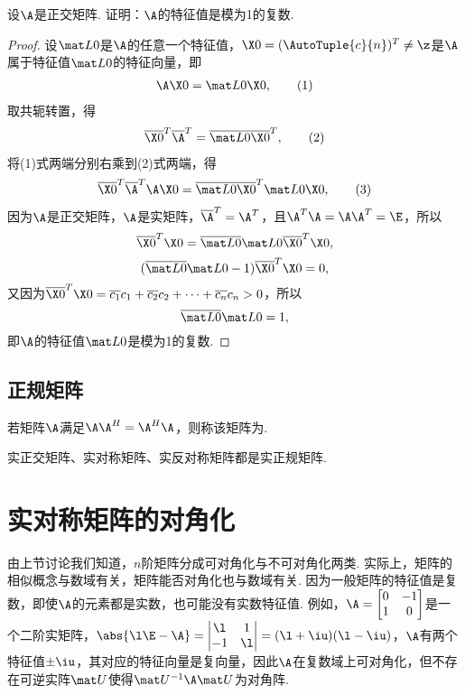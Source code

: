 \begin{example}
设\(\A\)是正交矩阵.
证明：\(\A\)的特征值是模为1的复数.
\begin{proof}
设\(\L0\)是\(\A\)的任意一个特征值，\(\X0=(\AutoTuple{c}{n})^T\neq\z\)是\(\A\)属于特征值\(\L0\)的特征向量，即\begin{gather}
\A\X0=\L0\X0, \tag1
\end{gather}
取共轭转置，得\begin{gather}
\overline{\X0}^T \overline{\A}^T = \overline{\L0} \overline{\X0}^T, \tag2
\end{gather}
将(1)式两端分别右乘到(2)式两端，得\begin{gather}
\overline{\X0}^T \overline{\A}^T \A\X0 = \overline{\L0} \overline{\X0}^T \L0\X0, \tag3
\end{gather}
因为\(\A\)是正交矩阵，\(\A\)是实矩阵，\(\overline{\A}^T = \A^T\)，且\(\A^T\A=\A\A^T=\E\)，所以\[
\overline{\X0}^T \X0 = \overline{\L0} \L0 \overline{\X0}^T \X0,
\]\[
(\overline{\L0} \L0 - 1) \overline{\X0}^T \X0 = 0,
\]又因为\(\overline{\X0}^T \X0 = \overline{c_1}c_1 + \overline{c_2}c_2 + \dotsb + \overline{c_n}{c_n} > 0\)，所以\[
\overline{\L0} \L0 = 1,
\]即\(\A\)的特征值\(\L0\)是模为1的复数.
\end{proof}
\end{example}

\subsection{正规矩阵}
\begin{definition}
若矩阵\(\A\)满足\(\A\A^H = \A^H\A\)，则称该矩阵为.
\end{definition}

\begin{property}
实正交矩阵、实对称矩阵、实反对称矩阵都是实正规矩阵.
\end{property}

\section{实对称矩阵的对角化}
由上节讨论我们知道，\(n\)阶矩阵分成可对角化与不可对角化两类.
实际上，矩阵的相似概念与数域有关，矩阵能否对角化也与数域有关.
因为一般矩阵的特征值是复数，即使\(\A\)的元素都是实数，也可能没有实数特征值.
例如，\(\A = \begin{bmatrix} 0 & -1 \\ 1 & 0 \end{bmatrix}\)是一个二阶实矩阵，\(\abs{\l\E-\A}=\begin{vmatrix} \l & 1 \\ -1 & \l \end{vmatrix} = (\l+\iu)(\l-\iu)\)，\(\A\)有两个特征值\(\pm\iu\)，其对应的特征向量是复向量，因此\(\A\)在复数域上可对角化，但不存在可逆实阵\(\P\)使得\(\P^{-1}\A\P\)为对角阵.

